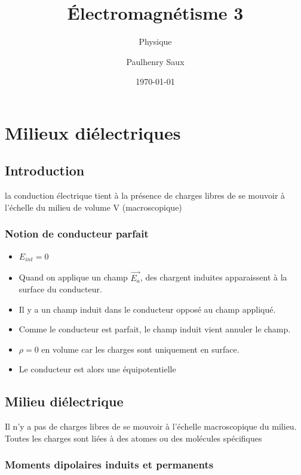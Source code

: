 \documentclass[french]{yLectureNote}
\title{Électromagnétisme 3}
\subtitle{Physique}
\author{Paulhenry Saux}
\date{\today}
\renewcommand{\vec}{\overrightarrow}
\begin{document}

\chapter{Milieux diélectriques}
\section{Introduction}
la conduction électrique tient à la présence de charges libres de se mouvoir à l'échelle du milieu de volume V (macroscopique)
\subsection{Notion de conducteur parfait}
\begin{proposition}
    \begin{itemize}
        \item $E_{int} = 0$
        \item Quand on applique un champ $\vec{E_a}$, des chargent induites apparaissent à la surface du conducteur.
        \item Il y a un champ induit dans le conducteur opposé au champ appliqué.
        \item Comme le conducteur est parfait, le champ induit vient annuler le champ.
        \item $\rho = 0$ en volume car les charges sont uniquement en surface.
        \item Le conducteur est alors une équipotentielle
    \end{itemize}
\end{proposition}
\section{Milieu diélectrique}
\begin{definition}
    Il n'y a pas de charges libres de se mouvoir à l'échelle macroscopique du milieu. Toutes les charges sont liées à des atomes ou des molécules spécifiques
\end{definition}
\subsection{Moments dipolaires induits et permanents}
\end{document}
